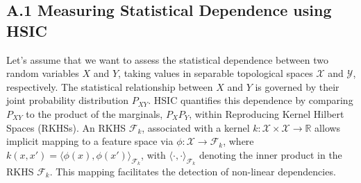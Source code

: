 \label{app:hsic_theory}

\subsection*{A.1 Measuring Statistical Dependence using HSIC}
\label{subsec:hsic_rkhs}
Let's assume that we want to assess the statistical dependence between two random variables $X$ and $Y$, taking values in separable topological spaces $\mathcal{X}$ and $\mathcal{Y}$, respectively. The statistical relationship between $X$ and $Y$ is governed by their joint probability distribution $P_{XY}$. HSIC quantifies this dependence by comparing $P_{XY}$ to the product of the marginals, $P_X P_Y$, within Reproducing Kernel Hilbert Spaces (RKHSs). An RKHS $\mathcal{F}_k$, associated with a kernel $k: \mathcal{X} \times \mathcal{X} \to \mathbb{R}$ allows implicit mapping to a feature space via $\phi: \mathcal{X} \to \mathcal{F}_k$, where $k(x, x') = \langle \phi(x), \phi(x') \rangle_{\mathcal{F}_k}$, with $\langle \cdot, \cdot \rangle_{\mathcal{F}_k}$ denoting the inner product in the RKHS $\mathcal{F}_k$. This mapping facilitates the detection of non-linear dependencies.


